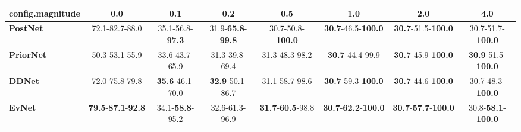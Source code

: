 \begin{tabular}{lccccccc}
\toprule
\textbf{config.magnitude} &                                        0.0 &                      0.1 &                               0.2 &                               0.5 &                                         1.0 &                                         2.0 &                                4.0 \\
\midrule
\textbf{PostNet } &                             72.1-82.7-88.0 &  35.1-56.8-\textbf{97.3} &  31.9-\textbf{65.8}-\textbf{99.8} &          30.7-50.8-\textbf{100.0} &           \textbf{30.7}-46.5-\textbf{100.0} &           \textbf{30.7}-51.5-\textbf{100.0} &           30.7-51.7-\textbf{100.0} \\
\textbf{PriorNet} &                             50.3-53.1-55.9 &           33.6-43.7-65.9 &                    31.3-39.8-69.4 &                    31.3-48.3-98.2 &                     \textbf{30.7}-44.4-99.9 &           \textbf{30.7}-45.9-\textbf{100.0} &  \textbf{30.9}-51.5-\textbf{100.0} \\
\textbf{DDNet   } &                             72.0-75.8-79.8 &  \textbf{35.6}-46.1-70.0 &           \textbf{32.9}-50.1-86.7 &                    31.1-58.7-98.6 &           \textbf{30.7}-59.3-\textbf{100.0} &           \textbf{30.7}-44.6-\textbf{100.0} &           30.7-48.3-\textbf{100.0} \\
\textbf{EvNet   } &  \textbf{79.5}-\textbf{87.1}-\textbf{92.8} &  34.1-\textbf{58.8}-95.2 &                    32.6-61.3-96.9 &  \textbf{31.7}-\textbf{60.5}-98.8 &  \textbf{30.7}-\textbf{62.2}-\textbf{100.0} &  \textbf{30.7}-\textbf{57.7}-\textbf{100.0} &  30.8-\textbf{58.1}-\textbf{100.0} \\
\bottomrule
\end{tabular}
